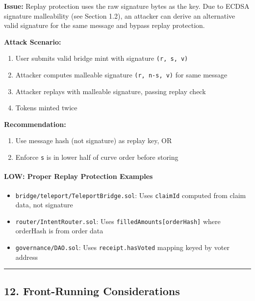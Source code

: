 \documentclass[
]{article}
\providecommand{\tightlist}{%
  \setlength{\itemsep}{0pt}\setlength{\parskip}{0pt}}
\begin{document}
\textbf{Issue:} Replay protection uses the raw signature bytes as the
key. Due to ECDSA signature malleability (see Section 1.2), an attacker
can derive an alternative valid signature for the same message and
bypass replay protection.

\textbf{Attack Scenario:}

\begin{enumerate}
\def\labelenumi{\arabic{enumi}.}
\tightlist
\item
  User submits valid bridge mint with signature \texttt{(r,\ s,\ v)}
\item
  Attacker computes malleable signature
  \texttt{(r,\ n-s,\ v\textquotesingle{})} for same message
\item
  Attacker replays with malleable signature, passing replay check
\item
  Tokens minted twice
\end{enumerate}

\textbf{Recommendation:}

\begin{enumerate}
\def\labelenumi{\arabic{enumi}.}
\tightlist
\item
  Use message hash (not signature) as replay key, OR
\item
  Enforce \texttt{s} is in lower half of curve order before storing
\end{enumerate}

\paragraph{LOW: Proper Replay Protection
Examples}\label{low-proper-replay-protection-examples}

\begin{itemize}
\tightlist
\item
  \texttt{bridge/teleport/TeleportBridge.sol}: Uses \texttt{claimId}
  computed from claim data, not signature
\item
  \texttt{router/IntentRouter.sol}: Uses
  \texttt{filledAmounts{[}orderHash{]}} where orderHash is from order
  data
\item
  \texttt{governance/DAO.sol}: Uses \texttt{receipt.hasVoted} mapping
  keyed by voter address
\end{itemize}

\begin{center}\rule{0.5\linewidth}{0.5pt}\end{center}

\subsection{12. Front-Running
Considerations}\label{12-front-running-considerations}
\end{document}
